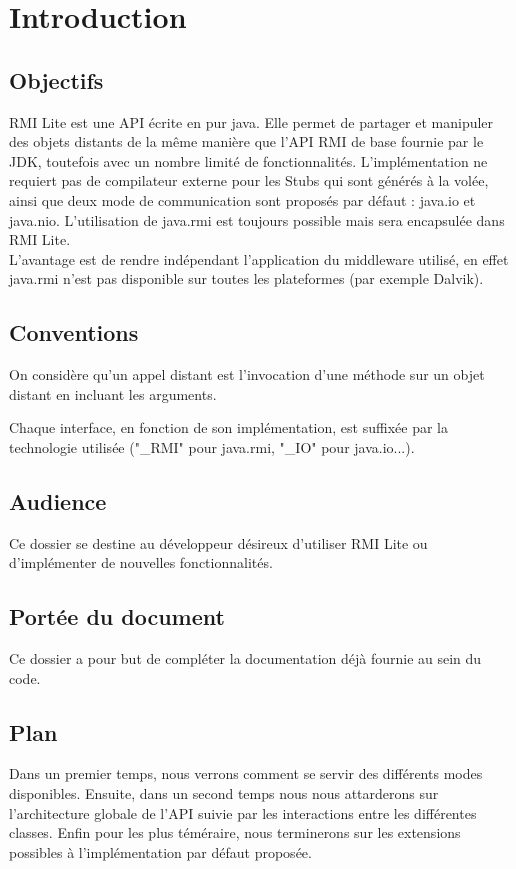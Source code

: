 \chapter{Introduction}

\section{Objectifs}

RMI Lite est une API écrite en pur java. Elle permet de partager et manipuler des objets distants de la même manière que l'API RMI de base fournie par le JDK, toutefois avec un nombre limité de fonctionnalités. L'implémentation ne requiert pas de compilateur externe pour les Stubs qui sont générés à la volée, ainsi que deux mode de communication sont proposés par défaut : java.io et java.nio. L'utilisation de java.rmi est toujours possible mais sera encapsulée dans RMI Lite.\\

L'avantage est de rendre indépendant l'application du middleware utilisé, en effet java.rmi n'est pas disponible sur toutes les plateformes (par exemple Dalvik).

\section{Conventions}
On considère qu'un appel distant est l'invocation d'une méthode sur un objet distant en incluant les arguments.
\medskip

Chaque interface, en fonction de son implémentation, est suffixée par la technologie utilisée ("\_RMI" pour java.rmi, "\_IO" pour java.io...).

\section{Audience}
Ce dossier se destine au développeur désireux d'utiliser RMI Lite ou d'implémenter de nouvelles fonctionnalités.

\section{Portée du document}
Ce dossier a pour but de compléter la documentation déjà fournie au sein du code.

\section{Plan}
Dans un premier temps, nous verrons comment se servir des différents modes disponibles. Ensuite, dans un second temps nous nous attarderons sur l'architecture globale de l'API suivie par les interactions entre les différentes classes. Enfin pour les plus téméraire, nous terminerons sur les extensions possibles à l'implémentation par défaut proposée.

